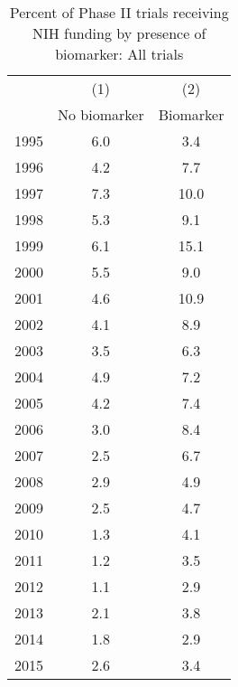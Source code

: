 \begin{table}[htbp]\centering
\caption{Percent of Phase II trials receiving NIH funding by presence of biomarker: All trials}
\begin{tabular}{l*{2}{c}}
\hline\hline
                    &\multicolumn{1}{c}{(1)}&\multicolumn{1}{c}{(2)}\\
                    &\multicolumn{1}{c}{No biomarker}&\multicolumn{1}{c}{Biomarker}\\
\hline
1995                &         6.0&         3.4\\
1996                &         4.2&         7.7\\
1997                &         7.3&        10.0\\
1998                &         5.3&         9.1\\
1999                &         6.1&        15.1\\
2000                &         5.5&         9.0\\
2001                &         4.6&        10.9\\
2002                &         4.1&         8.9\\
2003                &         3.5&         6.3\\
2004                &         4.9&         7.2\\
2005                &         4.2&         7.4\\
2006                &         3.0&         8.4\\
2007                &         2.5&         6.7\\
2008                &         2.9&         4.9\\
2009                &         2.5&         4.7\\
2010                &         1.3&         4.1\\
2011                &         1.2&         3.5\\
2012                &         1.1&         2.9\\
2013                &         2.1&         3.8\\
2014                &         1.8&         2.9\\
2015                &         2.6&         3.4\\
\hline\hline
\end{tabular}
\end{table}
